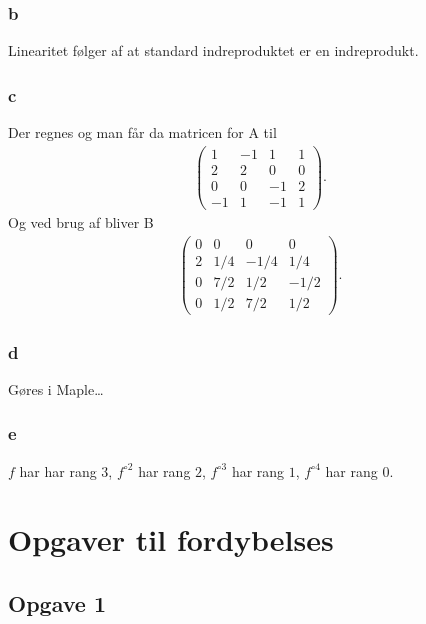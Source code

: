 			\subsubsection{b}

				Linearitet følger af at standard indreproduktet er en indreprodukt.

			\subsubsection{c}

				Der regnes og man får da matricen for A til
					\begin{align*}
						\left(\begin{array}{rrrr} 1 & -1 & 1 & 1 \\ 2 & 2 & 0 & 0 \\ 0 & 0 & -1 & 2 \\ -1 & 1 & -1 & 1 \end{array}\right).
					\end{align*} 
				Og ved brug af \cite[Eksempel 4.4.16]{hesselholt2017} bliver B 
					\begin{align*}
						\left(\begin{array}{rrrr} 0 & 0 & 0 & 0 \\ 2 & 1/4 & -1/4 & 1/4 \\ 0 & 7/2 & 1/2 & -1/2 \\ 0 & 1/2 & 7/2 & 1/2 \end{array}\right).
					\end{align*} 

			\subsubsection{d}

				Gøres i Maple\ldots

			\subsubsection{e}

				$f$ har har rang $3$, $f^{\circ 2}$ har rang $2$, $f^{\circ 3}$ har rang $1$, $f^{\circ 4}$ har rang $0$.



	\section{Opgaver til fordybelses}

		\subsection{Opgave 1}

